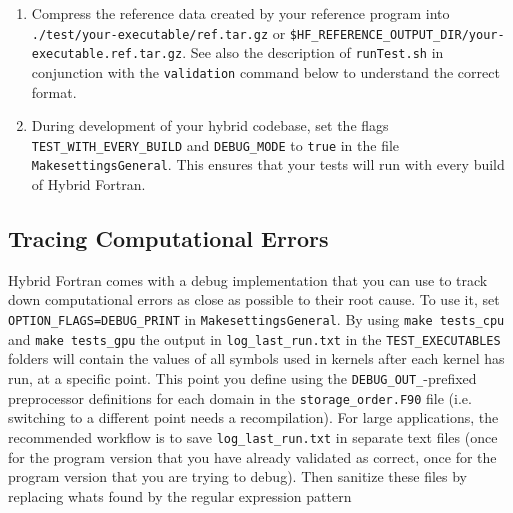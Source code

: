 \begin{enumerate}
  \item Compress the reference data created by your reference program into \linebreak\verb|./test/your-executable/ref.tar.gz| or \linebreak\verb|$HF_REFERENCE_OUTPUT_DIR/your-executable.ref.tar.gz|. See also the description of \verb|runTest.sh| in conjunction with the \verb|validation| command below to understand the correct format.
  \item During development of your hybrid codebase, set the flags \verb|TEST_WITH_EVERY_BUILD| and \verb|DEBUG_MODE| to \verb|true| in the file \verb|MakesettingsGeneral|. This ensures that your tests will run with every build of Hybrid Fortran.
\end{enumerate}

\subsection{Tracing Computational Errors} \label{sub:debugTracing}
Hybrid Fortran comes with a debug implementation that you can use to track down computational errors as close as possible to their root cause. To use it, set \verb|OPTION_FLAGS=DEBUG_PRINT| in \verb|MakesettingsGeneral|. By using \verb|make tests_cpu| and \verb|make tests_gpu| the output in \verb|log_last_run.txt| in the \verb|TEST_EXECUTABLES| folders will contain the values of all symbols used in kernels after each kernel has run, at a specific point. This point you define using the \verb|DEBUG_OUT_|-prefixed preprocessor definitions for each domain in the \verb|storage_order.F90| file (i.e. switching to a different point needs a recompilation). For large applications, the recommended workflow is to save \verb|log_last_run.txt| in separate text files (once for the program version that you have already validated as correct, once for the program version that you are trying to debug). Then sanitize these files by replacing whats found by the regular expression pattern
